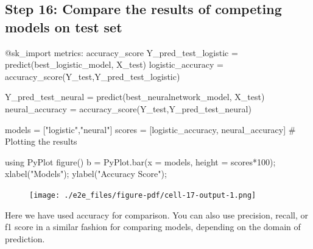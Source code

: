 \documentclass[
  letterpaper,
]{book}
\newenvironment{Shaded}{\begin{snugshade}}{\end{snugshade}}
\newcommand{\BuiltInTok}[1]{\textcolor[rgb]{0.00,0.23,0.31}{#1}}
\newcommand{\CommentTok}[1]{\textcolor[rgb]{0.37,0.37,0.37}{#1}}
\newcommand{\FloatTok}[1]{\textcolor[rgb]{0.68,0.00,0.00}{#1}}
\newcommand{\FunctionTok}[1]{\textcolor[rgb]{0.28,0.35,0.67}{#1}}
\newcommand{\ImportTok}[1]{\textcolor[rgb]{0.00,0.46,0.62}{#1}}
\newcommand{\NormalTok}[1]{\textcolor[rgb]{0.00,0.23,0.31}{#1}}
\newcommand{\OperatorTok}[1]{\textcolor[rgb]{0.37,0.37,0.37}{#1}}
\newcommand{\PreprocessorTok}[1]{\textcolor[rgb]{0.68,0.00,0.00}{#1}}
\newcommand{\StringTok}[1]{\textcolor[rgb]{0.13,0.47,0.30}{#1}}
\begin{document}
\hypertarget{step-16-compare-the-results-of-competing-models-on-test-set}{%
\subsection*{Step 16: Compare the results of competing models on test
set}\label{step-16-compare-the-results-of-competing-models-on-test-set}}

\begin{Shaded}
\begin{Highlighting}[]
\PreprocessorTok{@sk\_import}\NormalTok{ metrics}\OperatorTok{:}\NormalTok{ accuracy\_score}
\NormalTok{Y\_pred\_test\_logistic }\OperatorTok{=} \FunctionTok{predict}\NormalTok{(best\_logistic\_model, X\_test)}
\NormalTok{logistic\_accuracy }\OperatorTok{=} \FunctionTok{accuracy\_score}\NormalTok{(Y\_test,Y\_pred\_test\_logistic)}

\NormalTok{Y\_pred\_test\_neural }\OperatorTok{=} \FunctionTok{predict}\NormalTok{(best\_neuralnetwork\_model, X\_test)}
\NormalTok{neural\_accuracy }\OperatorTok{=} \FunctionTok{accuracy\_score}\NormalTok{(Y\_test,Y\_pred\_test\_neural)}

\NormalTok{models }\OperatorTok{=}\NormalTok{ [}\StringTok{"logistic"}\NormalTok{,}\StringTok{"neural"}\NormalTok{]}
\NormalTok{scores }\OperatorTok{=}\NormalTok{ [logistic\_accuracy, neural\_accuracy]}
\CommentTok{\# Plotting the results }

\ImportTok{using} \BuiltInTok{PyPlot  }
\FunctionTok{figure}\NormalTok{()}
\NormalTok{b }\OperatorTok{=}\NormalTok{ PyPlot.}\FunctionTok{bar}\NormalTok{(x }\OperatorTok{=}\NormalTok{ models, height }\OperatorTok{=}\NormalTok{ scores}\OperatorTok{*}\FloatTok{100}\NormalTok{);}
\FunctionTok{xlabel}\NormalTok{(}\StringTok{"Models"}\NormalTok{); }
\FunctionTok{ylabel}\NormalTok{(}\StringTok{"Accuracy Score"}\NormalTok{); }
\end{Highlighting}
\end{Shaded}

\begin{figure}[H]

{\centering \texttt{[image: ./e2e\_files/figure-pdf/cell-17-output-1.png]}

}

\end{figure}

Here we have used accuracy for comparison. You can also use precision,
recall, or f1 score in a similar fashion for comparing models, depending
on the domain of prediction.
\end{document}
